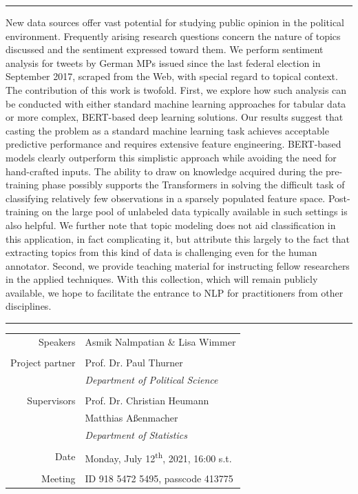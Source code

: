 \documentclass[12pt]{article}
\begin{document}
\begin{titlepage}
\begin{center}
\rule{\textwidth}{1pt}
\small
New data sources offer vast potential for studying public opinion in the 
political environment.
Frequently arising research questions concern the nature of topics discussed 
and the sentiment expressed toward them.
We perform sentiment analysis for tweets by German MPs issued since the last 
federal election in September 2017, scraped from the Web, with special regard to 
topical context.
The contribution of this work is twofold.
First, we explore how such analysis can be conducted with either standard 
machine learning approaches for tabular data or more complex, BERT-based deep 
learning solutions.
Our results suggest that casting the problem as a standard machine 
learning task achieves acceptable 
predictive performance and requires extensive feature engineering.
BERT-based models clearly outperform this simplistic approach while avoiding 
the need for hand-crafted inputs.
The ability to draw on knowledge acquired during the pre-training phase possibly 
supports the Transformers in solving the difficult task of classifying 
relatively few observations in a sparsely populated feature space.
Post-training on the large pool of unlabeled data typically available in such 
settings is also helpful.
We further note that topic modeling does not aid classification in this 
application, in fact complicating it, but attribute this largely to the fact 
that extracting topics from this kind of data is challenging even for the 
human annotator.
Second, we provide teaching material for instructing fellow researchers in the 
applied techniques.
With this collection, which will remain publicly available, we hope to 
facilitate the entrance to NLP for practitioners from other disciplines.
\rule{\textwidth}{1pt}


\vspace{0.3cm}

\begin{tabular}{rl}
  Speakers & Asmik Nalmpatian \& Lisa Wimmer \\
  & \\
  Project partner & Prof. Dr. Paul Thurner \\
  & \textit{Department of Political Science} \\
  & \\
  Supervisors & Prof. Dr. Christian Heumann\\
  & Matthias Aßenmacher \\
  & \textit{Department of Statistics} \\
  & \\
  Date & Monday, July 12\textsuperscript{th}, 2021, 16:00 s.t. \\
  & \\
  Meeting & ID 918 5472 5495, passcode 413775
\end{tabular}


\end{center}
\end{titlepage}
\end{document}
